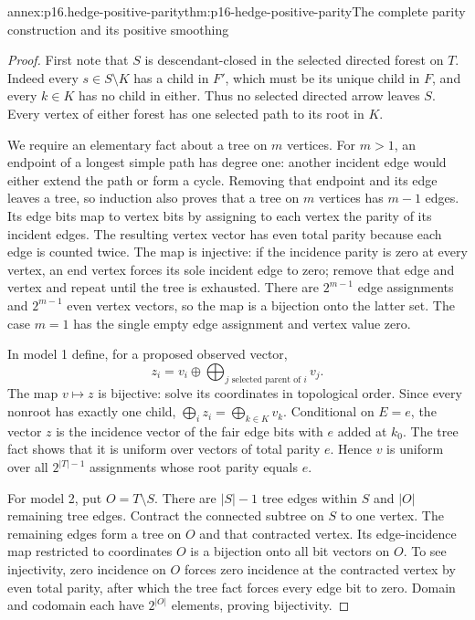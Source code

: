 \begin{annexitem}{annex:p16.hedge-positive-parity}{thm:p16-hedge-positive-parity}{The complete parity construction and its positive smoothing}
\begin{proof}
First note that \(S\) is descendant-closed in the selected directed
forest on \(T\). Indeed every \(s\in S\setminus K\) has
a child in \(F'\), which must be its unique child in \(F\),
and every \(k\in K\) has no child in either. Thus no selected
directed arrow leaves \(S\). Every vertex of either forest has
one selected path to its root in \(K\).

We require an elementary fact about a tree on \(m\) vertices.
For \(m>1\), an endpoint of a longest simple path has degree
one: another incident edge would either extend the path or form a
cycle. Removing that endpoint and its edge leaves a tree, so induction
also proves that a tree on \(m\) vertices has \(m-1\) edges.
Its edge bits map to vertex bits by assigning to each vertex the
parity of its incident edges. The resulting vertex vector has even
total parity because each edge is counted twice. The map is
injective: if the incidence parity is zero at every vertex, an
end vertex forces its sole incident edge to zero; remove that edge
and vertex and repeat until the tree is exhausted. There are
\(2^{m-1}\) edge assignments and \(2^{m-1}\) even vertex
vectors, so the map is a bijection onto the latter set. The case
\(m=1\) has the single empty edge assignment and vertex value zero.

In model 1 define, for a proposed observed vector,
\[
 z_i=v_i\oplus\bigoplus_{j\text{ selected parent of }i}v_j.
\]
The map \(v\mapsto z\) is bijective: solve its coordinates
in topological order. Since every nonroot has exactly one child,
\(\bigoplus_i z_i=\bigoplus_{k\in K}v_k\).
Conditional on \(E=e\), the vector \(z\) is the incidence
vector of the fair edge bits with \(e\) added at \(k_0\).
The tree fact shows that it is uniform over vectors of total parity
\(e\). Hence \(v\) is uniform over all \(2^{|T|-1}\)
assignments whose root parity equals \(e\).

For model 2, put \(O=T\setminus S\). There are \(|S|-1\)
tree edges within \(S\) and \(|O|\) remaining tree edges.
Contract the connected subtree on \(S\) to one vertex. The
remaining edges form a tree on \(O\) and that contracted vertex.
Its edge-incidence map restricted to coordinates \(O\) is a
bijection onto all bit vectors on \(O\). To see injectivity,
zero incidence on \(O\) forces zero incidence at the contracted
vertex by even total parity, after which the tree fact forces
every edge bit to zero. Domain and codomain each have \(2^{|O|}\)
elements, proving bijectivity.


\end{proof}
\end{annexitem}
